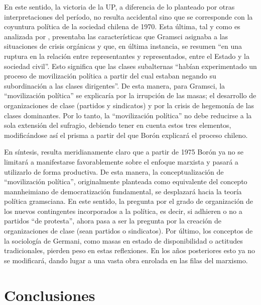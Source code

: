 En este sentido, la victoria de la UP, a diferencia de lo planteado por otras interpretaciones del período, no resulta accidental sino que se corresponde con la coyuntura política de la sociedad chilena de 1970. Esta última, tal y como es analizada por \textcite[75]{1574-BORON1975}, presentaba las características que Gramsci asignaba a las situaciones de crisis orgánicas y que, en última instancia, se resumen \enquote{en una ruptura en la relación entre representantes y representados, entre el Estado y la sociedad civil}. Esto significa que las clases subalternas \enquote{habían experimentado un proceso de movilización política a partir del cual estaban negando su subordinación a las clases dirigentes}. De esta manera, para Gramsci, la \enquote{movilización política} se explicaría por la irrupción de las masas; el desarrollo de organizaciones de clase (partidos y sindicatos) y por la crisis de hegemonía de las clases dominantes. Por lo tanto, la \enquote{movilización política} no debe reducirse a la sola extensión del sufragio, debiendo tener en cuenta estos tres elementos, modificándose así el prisma a partir del que Borón explicará el proceso chileno.

En síntesis, resulta meridianamente claro que a partir de 1975 Borón ya no se limitará a manifestarse favorablemente sobre el enfoque marxista y pasará a utilizarlo de forma productiva. De esta manera, la conceptualización de \enquote{movilización política}, originalmente planteada como equivalente del concepto mannheimiano de democratización fundamental, se desplazará hacia la teoría política gramsciana. En este sentido, la pregunta por el grado de organización de los nuevos contingentes incorporados a la política, es decir, si adhieren o no a partidos \enquote{de protesta}, ahora pasa a ser la pregunta por la creación de organizaciones de clase (sean partidos o sindicatos). Por último, los conceptos de la sociología de Germani, como masas en estado de disponibilidad o actitudes tradicionales, pierden peso en estas reflexiones. En los años posteriores esto ya no se modificará, dando lugar a una vasta obra enrolada en las filas del marxismo.

\section{Conclusiones}

